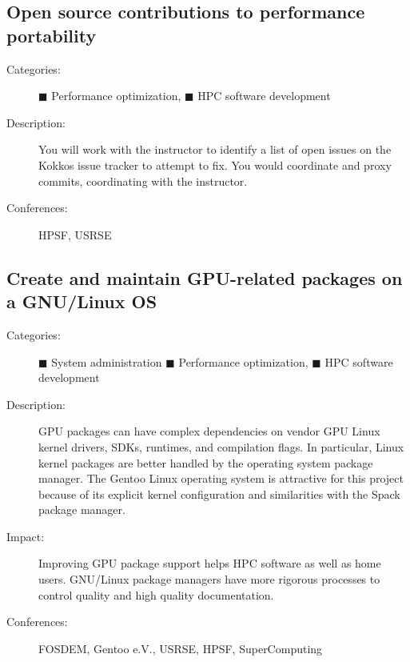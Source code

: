 \documentclass[12pt]{article}
\begin{document}
\subsection{Open source contributions to performance portability}
\begin{description}
\item[Categories:]
  \textcolor{orange!90!black}{$\blacksquare$} Performance optimization,
  \textcolor{blue!80!black}{$\blacksquare$} HPC software development
\item[Description:] You will work with the instructor %
  to identify a list of open issues on the Kokkos issue tracker %
  to attempt to fix.
  You would coordinate and proxy commits, %
  coordinating with the instructor.
\item[Conferences:] HPSF, USRSE
\end{description}

\subsection{Create and maintain GPU-related packages on a GNU/Linux OS}
\begin{description}
\item[Categories:]
  \textcolor{black!60}{$\blacksquare$} System administration
  \textcolor{orange!90!black}{$\blacksquare$} Performance optimization,
  \textcolor{blue!80!black}{$\blacksquare$} HPC software development
\item[Description:] GPU packages can have complex dependencies %
  on vendor GPU Linux kernel drivers, SDKs, runtimes, and compilation flags.
  In particular, %
  Linux kernel packages %
  are better handled by the operating system package manager.
  The Gentoo Linux operating system %
  is attractive for this project %
  because of its explicit kernel configuration %
  and similarities with the Spack package manager.
\item[Impact:] Improving GPU package support helps HPC software %
  as well as home users.
  GNU/Linux package managers %
  have more rigorous processes to control quality %
  and high quality documentation.
\item[Conferences:] FOSDEM, Gentoo e.V., USRSE, HPSF, SuperComputing
\end{description}
\end{document}
